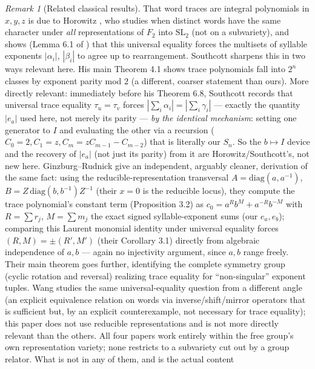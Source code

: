 \documentclass[11pt,a4paper]{article}
\theoremstyle{definition}
\theoremstyle{remark}
\newtheorem{remark}[theorem]{Remark}
\begin{document}
\begin{remark}[Related classical results]
That word traces are integral polynomials in $x,y,z$ is due to Horowitz
\cite{Horowitz1972}, who studies when distinct words have the same
character under \emph{all} representations of $F_2$ into $\mathrm{SL}_2$
(not on a subvariety), and shows (Lemma 6.1 of \cite{Horowitz1972}) that
this universal equality forces the multisets of syllable exponents
$|\alpha_i|$, $|\beta_i|$ to agree up to rearrangement. Southcott
\cite{Southcott1979} sharpens this in two ways relevant here. His main
Theorem 4.1 shows trace polynomials fall into $2^n$ classes by exponent
parity mod $2$ (a different, coarser statement than ours). More directly
relevant: immediately before his Theorem 6.8, Southcott records that
universal trace equality $\tau_u=\tau_v$ forces
$|\sum_i\alpha_i|=|\sum_i\gamma_i|$ --- exactly the quantity $|e_a|$ used
here, not merely its parity --- \emph{by the identical mechanism}: setting
one generator to $I$ and evaluating the other via a recursion
($C_0=2,C_1=z,C_m=zC_{m-1}-C_{m-2}$) that is literally our $S_n$. So the
$b\mapsto I$ device and the recovery of $|e_a|$ (not just its parity) from
it are Horowitz/Southcott's, not new here. Ginzburg--Rudnick \cite{GinzburgRudnick1998} give an
independent, arguably cleaner, derivation of the same fact: using the
reducible-representation transversal $A=\mathrm{diag}(a,a^{-1})$,
$B=Z\,\mathrm{diag}(b,b^{-1})Z^{-1}$ (their $x=0$ is the reducible locus),
they compute the trace polynomial's constant term (Proposition 3.2) as
$c_0=a^R b^M+a^{-R}b^{-M}$ with $R=\sum r_j$, $M=\sum m_j$ the exact
signed syllable-exponent sums (our $e_a,e_b$); comparing this Laurent
monomial identity under universal equality forces $(R,M)=\pm(R',M')$
(their Corollary 3.1) directly from algebraic independence of $a,b$ ---
again no injectivity argument, since $a,b$ range freely. Their main
theorem goes further, identifying the complete symmetry group (cyclic
rotation and reversal) realizing trace equality for ``non-singular''
exponent tuples. Wang \cite{Wang2007} studies the same universal-equality
question from a different angle (an explicit equivalence relation on
words via inverse/shift/mirror operators that is sufficient but, by an
explicit counterexample, not necessary for trace equality); this paper
does not use reducible representations and is not more directly relevant
than the others. All four papers work entirely within the free group's
own representation variety; none restricts to a subvariety cut out by a
group relator. What is not in any of them, and is the actual content

\end{remark}
\end{document}

